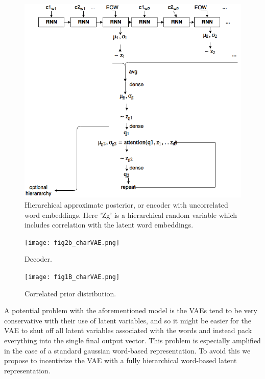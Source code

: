 \documentclass[journal, 12pt, draftcls, onecolumn]{IEEEtran}
\begin{document}
\begin{figure}
\centering
\includegraphics[scale=0.5]{fig1_charvae.png}
\caption{Hierarchical approximate posterior, or encoder with uncorrelated word embeddings. Here 'Zg' is a hierarchical random variable which includes correlation with the latent word embeddings.}
\end{figure}

\begin{figure}
\centering
\texttt{[image: fig2b\_charVAE.png]}
\caption{Decoder.}
\end{figure}

\begin{figure}
\centering
\texttt{[image: fig1B\_charVAE.png]}
\caption{Correlated prior distribution.}
\end{figure}

A potential problem with the aforementioned model is the VAEs tend to be very conservative with their use of latent variables, and so it might be easier for the VAE to shut off all latent variables associated with the words and instead pack everything into the single final output vector. This problem is especially amplified in the case of a standard gaussian word-based representation. To avoid this we propose to incentivize the VAE with a fully hierarchical word-based latent representation.
\end{document}
